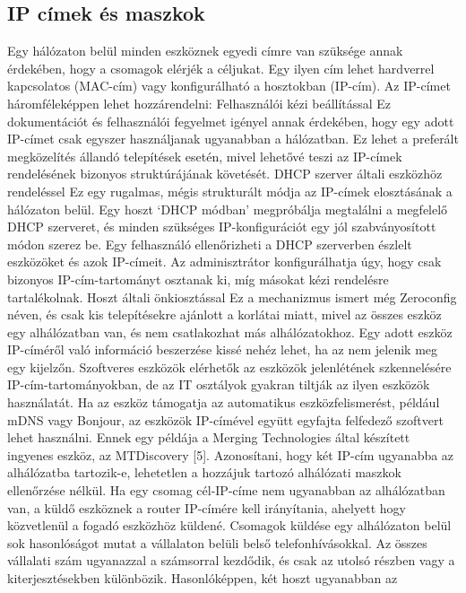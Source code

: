 \subsection{IP címek és maszkok}
Egy hálózaton belül minden eszköznek egyedi címre van szüksége annak érdekében,
hogy a csomagok elérjék a céljukat. Egy ilyen cím lehet hardverrel kapcsolatos
(MAC-cím) vagy konfigurálható a hosztokban (IP-cím). Az IP-címet háromféleképpen
lehet hozzárendelni: Felhasználói kézi beállítással Ez dokumentációt és
felhasználói fegyelmet igényel annak érdekében, hogy egy adott IP-címet csak
egyszer használjanak ugyanabban a hálózatban. Ez lehet a preferált megközelítés
állandó telepítések esetén, mivel lehetővé teszi az IP-címek rendelésének
bizonyos struktúrájának követését. DHCP szerver általi eszközhöz rendeléssel Ez
egy rugalmas, mégis strukturált módja az IP-címek elosztásának a hálózaton belül.
Egy hoszt `DHCP módban' megpróbálja megtalálni a megfelelő DHCP szerveret, és
minden szükséges IP-konfigurációt egy jól szabványosított módon szerez be. Egy
felhasználó ellenőrizheti a DHCP szerverben észlelt eszközöket és azok IP-címeit.
Az adminisztrátor konfigurálhatja úgy, hogy csak bizonyos IP-cím-tartományt
osztanak ki, míg másokat kézi rendelésre tartalékolnak. Hoszt általi
önkiosztással Ez a mechanizmus ismert még Zeroconfig néven, és csak kis
telepítésekre ajánlott a korlátai miatt, mivel az összes eszköz egy alhálózatban
van, és nem csatlakozhat más alhálózatokhoz. Egy adott eszköz IP-címéről való
információ beszerzése kissé nehéz lehet, ha az nem jelenik meg egy kijelzőn.
Szoftveres eszközök elérhetők az eszközök jelenlétének szkennelésére
IP-cím-tartományokban, de az IT osztályok gyakran tiltják az ilyen eszközök
használatát. Ha az eszköz támogatja az automatikus eszközfelismerést, például
mDNS vagy Bonjour, az eszközök IP-címével együtt egyfajta felfedező szoftvert
lehet használni. Ennek egy példája a Merging Technologies által készített
ingyenes eszköz, az MTDiscovery [5]. Azonosítani, hogy két IP-cím ugyanabba az
alhálózatba tartozik-e, lehetetlen a hozzájuk tartozó alhálózati maszkok
ellenőrzése nélkül. Ha egy csomag cél-IP-címe nem ugyanabban az alhálózatban van,
a küldő eszköznek a router IP-címére kell irányítania, ahelyett hogy
közvetlenül a fogadó eszközhöz küldené. Csomagok küldése egy alhálózaton belül
sok hasonlóságot mutat a vállalaton belüli belső telefonhívásokkal. Az összes
vállalati szám ugyanazzal a számsorral kezdődik, és csak az utolsó részben vagy
a kiterjesztésekben különbözik. Hasonlóképpen, két hoszt ugyanabban az
